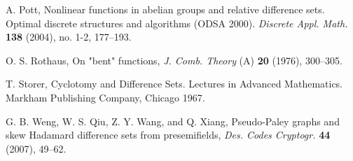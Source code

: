 \documentclass[11pt, reqno]{amsart}
\begin{document}
\begin{thebibliography}{A}
 A. Pott, Nonlinear functions in abelian groups and relative difference sets. Optimal discrete structures and algorithms
(ODSA 2000). {\it Discrete Appl. Math.} {\bf 138} (2004), no. 1-2,
177--193.

 O. S. Rothaus, On "bent" functions, {\it J. Comb. Theory} (A)
{\bf 20} (1976), 300--305.

 T. Storer,
\newblock Cyclotomy and Difference Sets.
\newblock Lectures in Advanced Mathematics. Markham Publishing Company, Chicago
1967.

 G. B. Weng, W. S. Qiu, Z. Y. Wang, and Q. Xiang, Pseudo-Paley graphs and skew Hadamard difference sets from presemifields,  {\it Des. Codes Cryptogr.} {\bf 44} (2007), 49--62.

\end{thebibliography}
%
\end{document}
